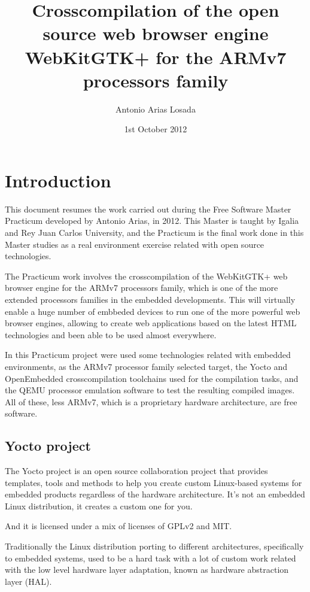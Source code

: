 \documentclass[a4paper,11pt,openany]{report}
\title{Crosscompilation of the open source web browser engine WebKitGTK+ for the ARMv7 processors family}
\author{Antonio Arias Losada}
\date{1st October 2012}
\begin{document}
\maketitle
\tableofcontents
\listoffigures


\chapter{Introduction}
This document resumes the work carried out during the Free Software Master\cite{master} Practicum developed by Antonio Arias, in 2012. This Master is taught by Igalia and Rey Juan Carlos University, and the Practicum is the final work done in this Master studies as a real environment exercise related with open source technologies.

The Practicum work involves the crosscompilation of the WebKitGTK+ web browser engine for the ARMv7 processors family, which is one of the more extended processors families in the embedded developments. This will virtually enable a huge number of embbeded devices to run one of the more powerful web browser engines, allowing to create web applications based on the latest HTML technologies and been able to be used almost everywhere.

In this Practicum project were used some technologies related with embedded environments, as the ARMv7 processor family selected target, the Yocto and OpenEmbedded crosscompilation toolchains used for the compilation tasks, and the QEMU processor emulation software to test the resulting compiled images. All of these, less ARMv7, which is a proprietary hardware architecture, are free software.

\section{Yocto project}
The Yocto\cite{yocto} project is an open source collaboration project that provides templates, tools and methods to help you create custom Linux-based systems for embedded products regardless of the hardware architecture. It's not an embedded Linux distribution, it creates a custom one for you.

And it is licensed under a mix of licenses of GPLv2 and MIT.

Traditionally the Linux distribution porting to different architectures, specifically to embedded systems, used to be a hard task with a lot of custom work related with the low level hardware layer adaptation, known as hardware abstraction layer (HAL).
\end{document}
